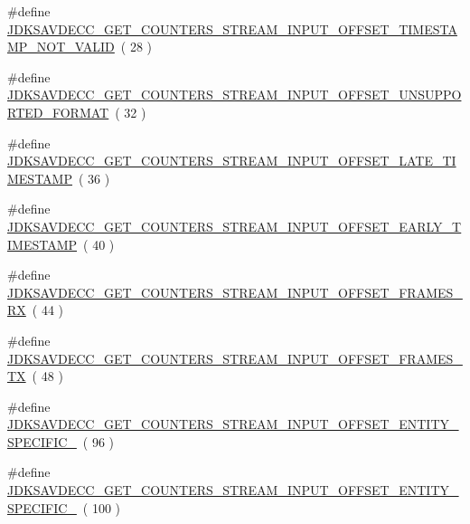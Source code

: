 \begin{DoxyCompactItemize}
\item 
\#define \hyperlink{group__get__counters__stream__input_ga9533767b73d8a5a47ae645cc6bd1826c}{J\+D\+K\+S\+A\+V\+D\+E\+C\+C\+\_\+\+G\+E\+T\+\_\+\+C\+O\+U\+N\+T\+E\+R\+S\+\_\+\+S\+T\+R\+E\+A\+M\+\_\+\+I\+N\+P\+U\+T\+\_\+\+O\+F\+F\+S\+E\+T\+\_\+\+T\+I\+M\+E\+S\+T\+A\+M\+P\+\_\+\+N\+O\+T\+\_\+\+V\+A\+L\+ID}~( 28 )
\item 
\#define \hyperlink{group__get__counters__stream__input_ga55cc05d210e17cbcc4f91f8ae4c45c3d}{J\+D\+K\+S\+A\+V\+D\+E\+C\+C\+\_\+\+G\+E\+T\+\_\+\+C\+O\+U\+N\+T\+E\+R\+S\+\_\+\+S\+T\+R\+E\+A\+M\+\_\+\+I\+N\+P\+U\+T\+\_\+\+O\+F\+F\+S\+E\+T\+\_\+\+U\+N\+S\+U\+P\+P\+O\+R\+T\+E\+D\+\_\+\+F\+O\+R\+M\+AT}~( 32 )
\item 
\#define \hyperlink{group__get__counters__stream__input_gac806a673c4df318e241e20378004fd97}{J\+D\+K\+S\+A\+V\+D\+E\+C\+C\+\_\+\+G\+E\+T\+\_\+\+C\+O\+U\+N\+T\+E\+R\+S\+\_\+\+S\+T\+R\+E\+A\+M\+\_\+\+I\+N\+P\+U\+T\+\_\+\+O\+F\+F\+S\+E\+T\+\_\+\+L\+A\+T\+E\+\_\+\+T\+I\+M\+E\+S\+T\+A\+MP}~( 36 )
\item 
\#define \hyperlink{group__get__counters__stream__input_gac8eb0586ea21dac9ce4c110392bfc6f3}{J\+D\+K\+S\+A\+V\+D\+E\+C\+C\+\_\+\+G\+E\+T\+\_\+\+C\+O\+U\+N\+T\+E\+R\+S\+\_\+\+S\+T\+R\+E\+A\+M\+\_\+\+I\+N\+P\+U\+T\+\_\+\+O\+F\+F\+S\+E\+T\+\_\+\+E\+A\+R\+L\+Y\+\_\+\+T\+I\+M\+E\+S\+T\+A\+MP}~( 40 )
\item 
\#define \hyperlink{group__get__counters__stream__input_gad7f0d0ae4963e7cbe016c3e53eb9c641}{J\+D\+K\+S\+A\+V\+D\+E\+C\+C\+\_\+\+G\+E\+T\+\_\+\+C\+O\+U\+N\+T\+E\+R\+S\+\_\+\+S\+T\+R\+E\+A\+M\+\_\+\+I\+N\+P\+U\+T\+\_\+\+O\+F\+F\+S\+E\+T\+\_\+\+F\+R\+A\+M\+E\+S\+\_\+\+RX}~( 44 )
\item 
\#define \hyperlink{group__get__counters__stream__input_ga9962d0453a1b0fc873feea2470ecc3e4}{J\+D\+K\+S\+A\+V\+D\+E\+C\+C\+\_\+\+G\+E\+T\+\_\+\+C\+O\+U\+N\+T\+E\+R\+S\+\_\+\+S\+T\+R\+E\+A\+M\+\_\+\+I\+N\+P\+U\+T\+\_\+\+O\+F\+F\+S\+E\+T\+\_\+\+F\+R\+A\+M\+E\+S\+\_\+\+TX}~( 48 )
\item 
\#define \hyperlink{group__get__counters__stream__input_ga62049bab6be98b76b5a22b776b325509}{J\+D\+K\+S\+A\+V\+D\+E\+C\+C\+\_\+\+G\+E\+T\+\_\+\+C\+O\+U\+N\+T\+E\+R\+S\+\_\+\+S\+T\+R\+E\+A\+M\+\_\+\+I\+N\+P\+U\+T\+\_\+\+O\+F\+F\+S\+E\+T\+\_\+\+E\+N\+T\+I\+T\+Y\+\_\+\+S\+P\+E\+C\+I\+F\+I\+C\+\_}~( 96 )
\item 
\#define \hyperlink{group__get__counters__stream__input_gaaa82c7096c2024fa9c12dfdbb6c5fe0f}{J\+D\+K\+S\+A\+V\+D\+E\+C\+C\+\_\+\+G\+E\+T\+\_\+\+C\+O\+U\+N\+T\+E\+R\+S\+\_\+\+S\+T\+R\+E\+A\+M\+\_\+\+I\+N\+P\+U\+T\+\_\+\+O\+F\+F\+S\+E\+T\+\_\+\+E\+N\+T\+I\+T\+Y\+\_\+\+S\+P\+E\+C\+I\+F\+I\+C\+\_}~( 100 )

\end{DoxyCompactItemize}
